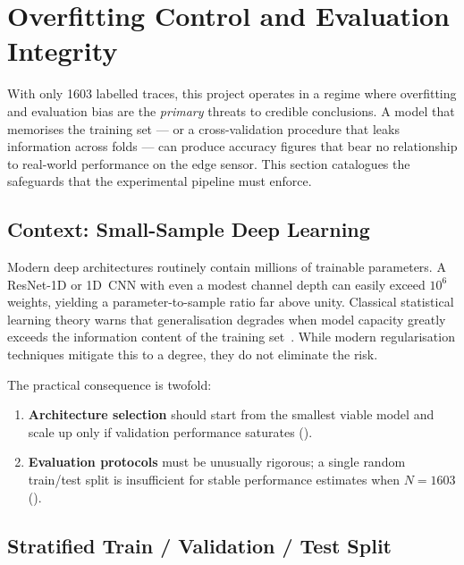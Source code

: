 
\section{Overfitting Control and Evaluation Integrity}
\label{sec:overfit}

With only \num{1603} labelled traces, this project operates in a regime
where overfitting and evaluation bias are the \emph{primary} threats to
credible conclusions.  A model that memorises the training set —
or a cross-validation procedure that leaks information across folds —
can produce accuracy figures that bear no relationship to real-world
performance on the edge sensor.  This section catalogues the safeguards
that the experimental pipeline must enforce.

\subsection{Context: Small-Sample Deep Learning}
\label{sec:overfit:context}

Modern deep architectures routinely contain millions of trainable
parameters.  A ResNet-1D or 1D~CNN with even a modest channel depth can
easily exceed $10^{6}$ weights, yielding a parameter-to-sample ratio far
above unity.  Classical statistical learning theory warns that
generalisation degrades when model capacity greatly exceeds the
information content of the training set~\cite{vapnik1995svm}.  While
modern regularisation techniques mitigate this to a degree, they do not
eliminate the risk.

The practical consequence is twofold:
\begin{enumerate}
  \item \textbf{Architecture selection} should start from the smallest
        viable model and scale up only if validation performance
        saturates ().
  \item \textbf{Evaluation protocols} must be unusually rigorous; a
        single random train/test split is insufficient for stable
        performance estimates when $N = 1603$
        ().
\end{enumerate}

\subsection{Stratified Train / Validation / Test Split}
\label{sec:overfit:split}

